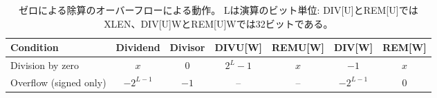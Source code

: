 \begin{table}[h]
\center
\begin{tabular}{|l|c|c||c|c|c|c|}
\hline
Condition              & Dividend   & Divisor & DIVU[W]   & REMU[W] & DIV[W]     & REM[W] \\ \hline
Division by zero       & $x$        & 0       & $2^{L}-1$ & $x$     & $-1$       & $x$    \\
Overflow (signed only) & $-2^{L-1}$ & $-1$    & --        & --      & $-2^{L-1}$ & 0      \\
\hline
\end{tabular}
\begin{comment}
\caption{Semantics for division by zero and division overflow.
L is the width of the operation in bits: XLEN for DIV[U] and REM[U], or
32 for DIV[U]W and REM[U]W.}
\end{comment}
\caption{ゼロによる除算のオーバーフローによる動作。
Lは演算のビット単位: DIV[U]とREM[U]ではXLEN、DIV[U]WとREM[U]Wでは32ビットである。}
\label{tab:divby0}
\end{table}

